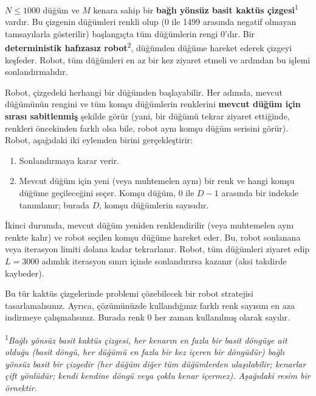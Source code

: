 \documentclass[12pt]{article}
\begin{document}
\renewcommand{\round}{Day 2}
\renewcommand{\problemName}{Görev Navigasyon \\ (Task Navigation)}
\renewcommand{\lang}{Türkçe}

\renewcommand{\tl}{$3$ saniye}
\renewcommand{\ml}{$512$ MB}
\problem{\problemName}

$N \leq 1000$ düğüm ve $M$ kenara sahip bir \textbf{bağlı yönsüz basit kaktüs çizgesi}\textsuperscript{1} vardır. Bu çizgenin düğümleri renkli olup (0 ile 1499 arasında negatif olmayan tamsayılarla gösterilir) başlangıçta tüm düğümlerin rengi 0'dır. Bir \textbf{deterministik hafızasız robot}\textsuperscript{2}, düğümden düğüme hareket ederek çizgeyi keşfeder. Robot, tüm düğümleri en az bir kez ziyaret etmeli ve ardından bu işlemi sonlandırmalıdır. 

Robot, çizgedeki herhangi bir düğümden başlayabilir. Her adımda, mevcut düğümünün rengini ve tüm komşu düğümlerin renklerini \textbf{mevcut düğüm için sırası sabitlenmiş} şekilde görür (yani, bir düğümü tekrar ziyaret ettiğinde, renkleri öncekinden farklı olsa bile, robot aynı komşu düğüm serisini görür). Robot, aşağıdaki iki eylemden birini gerçekleştirir:
\begin{enumerate}
    \item Sonlandırmaya karar verir.
    \item Mevcut düğüm için yeni (veya muhtemelen aynı) bir renk ve hangi komşu düğüme geçileceğini seçer. Komşu düğüm, $0$ ile $D-1$ arasında bir indeksle tanımlanır; burada $D$, komşu düğümlerin sayısıdır.
\end{enumerate}

İkinci durumda, mevcut düğüm yeniden renklendirilir (veya muhtemelen aynı renkte kalır) ve robot seçilen komşu düğüme hareket eder. Bu, robot sonlanana veya iterasyon limiti dolana kadar tekrarlanır. 
Robot, tüm düğümleri ziyaret edip $L = 3000$ adımlık iterasyon sınırı içinde sonlandırırsa kazanır (aksi takdirde kaybeder).

Bu tür kaktüs çizgelerinde problemi çözebilecek bir robot stratejisi tasarlamalısınız. Ayrıca, çözümünüzde kullandığınız farklı renk sayısını en aza indirmeye çalışmalısınız. Burada renk 0 her zaman kullanılmış olarak sayılır.

\textsuperscript{1}\textit{Bağlı yönsüz basit kaktüs çizgesi, her kenarın en fazla bir basit döngüye ait olduğu (basit döngü, her düğümü en fazla bir kez içeren bir döngüdür) bağlı yönsüz basit bir çizgedir (her düğüm diğer tüm düğümlerden ulaşılabilir; kenarlar çift yönlüdür; kendi kendine döngü veya çoklu kenar içermez). Aşağıdaki resim bir örnektir.}
\end{document}
